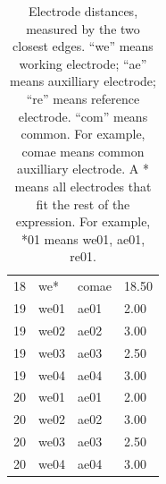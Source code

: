 \begin{table}
\begin{tabular}{llll}
		18 & we* & comae & 18.50 \\
		19 & we01 & ae01 & 2.00 \\
		19 & we02 & ae02 & 3.00 \\
		19 & we03 & ae03 & 2.50 \\
		19 & we04 & ae04 & 3.00 \\
		20 & we01 & ae01 & 2.00 \\
		20 & we02 & ae02 & 3.00 \\
		20 & we03 & ae03 & 2.50 \\
		20 & we04 & ae04 & 3.00
	\end{tabular}
	\caption[Electrode distances.]{Electrode distances, measured by the two closest edges. ``we'' means working electrode; ``ae'' means auxilliary electrode; ``re'' means reference electrode. ``com'' means common. For example, comae means common auxilliary electrode. A * means all electrodes that fit the rest of the expression. For example, *01 means we01, ae01, re01.}
	\label{electrode distance}
\end{table}
